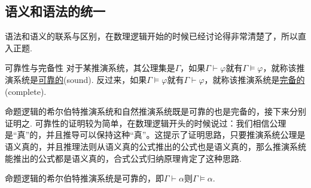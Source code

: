 \documentclass[main.tex]{subfiles}
\begin{document}
\vspace{1cm}

\subsection{语义和语法的统一}


语法和语义的联系与区别，在数理逻辑开始的时候已经讨论得非常清楚了，所以直入正题.

\begin{definition}{可靠性与完备性}
    对于某推演系统，其公理集是\(\Gamma\)，如果\(\Gamma \vdash \varphi\)就有\(\Gamma \vDash \varphi\)，就称该推演系统是\uline{可靠的}(sound). \newline
    反过来，如果\(\Gamma \vDash \varphi\)就有\(\Gamma \vdash \varphi\)，就称该推演系统是\uline{完备的}(complete).
\end{definition}

命题逻辑的希尔伯特推演系统和自然推演系统既是可靠的也是完备的，接下来分别证明之. 可靠性的证明较为简单，在数理逻辑开头的时候说过：我们相信公理是“真”的，并且推导可以保持这种“真”。这提示了证明思路，只要推演系统公理是语义真的，并且推理法则从语义真的公式推出的公式也是语义真的，那么推演系统能推出的公式都是语义真的，合式公式归纳原理肯定了这种思路.

\begin{theorem}{}
    命题逻辑的希尔伯特推演系统是可靠的，即\(\Gamma \vdash \alpha\)则\(\Gamma \vDash \alpha\).
\end{theorem}
\end{document}
